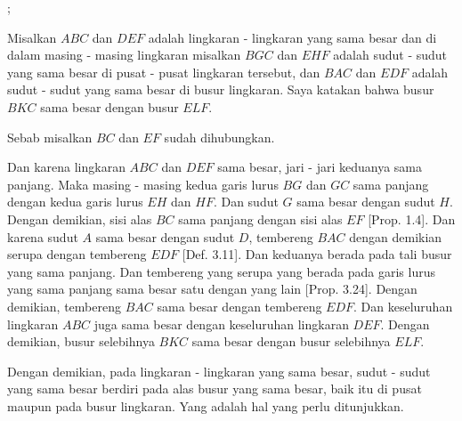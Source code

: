 \documentclass[a4paper]{book}
\begin{document}
\begin{center}
; 
\end{center}

Misalkan $ABC$ dan $DEF$ adalah lingkaran - lingkaran yang sama besar 
dan di dalam masing - masing lingkaran misalkan $BGC$ dan $EHF$ adalah 
sudut - sudut yang sama besar di pusat - pusat lingkaran tersebut, dan 
$BAC$ dan $EDF$ adalah sudut - sudut yang sama besar di busur lingkaran.
Saya katakan bahwa busur $BKC$ sama besar dengan busur $ELF$.

Sebab misalkan $BC$ dan $EF$ sudah dihubungkan.

Dan karena lingkaran $ABC$ dan $DEF$ sama besar, jari - jari keduanya
sama panjang. Maka masing - masing kedua garis lurus $BG$ dan $GC$ 
sama panjang dengan kedua garis lurus $EH$ dan $HF$. Dan sudut $G$
sama besar dengan sudut $H$. Dengan demikian, sisi alas $BC$ sama 
panjang dengan sisi alas $EF$ [Prop. 1.4]. Dan karena sudut $A$ sama
besar dengan sudut $D$, tembereng $BAC$ dengan demikian serupa dengan
tembereng $EDF$ [Def. 3.11]. Dan keduanya berada pada tali busur yang
sama panjang. Dan tembereng yang serupa yang berada pada garis lurus
yang sama panjang sama besar satu dengan yang lain [Prop. 3.24].
Dengan demikian, tembereng $BAC$ sama besar dengan tembereng
$EDF$. Dan keseluruhan lingkaran $ABC$ juga sama besar dengan
keseluruhan lingkaran $DEF$. Dengan demikian, busur selebihnya $BKC$ 
sama besar dengan busur selebihnya $ELF$.

Dengan demikian, pada lingkaran - lingkaran yang sama besar, sudut - 
sudut yang sama besar berdiri pada alas busur yang sama besar, baik itu 
di pusat maupun pada busur lingkaran.  Yang adalah hal yang 
perlu ditunjukkan.
\end{document}
